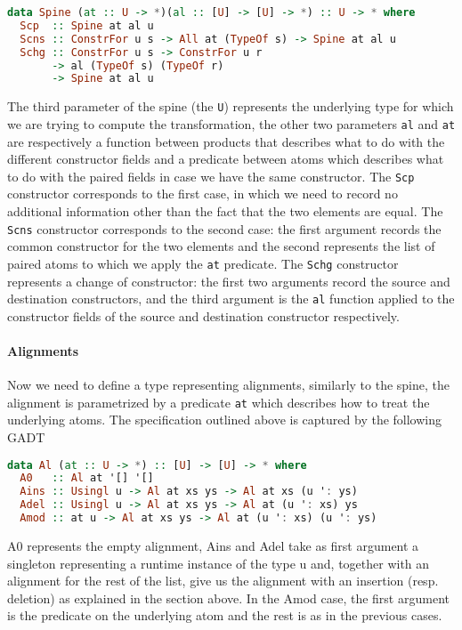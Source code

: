 \documentclass[11pt]{article}
\begin{document}
\begin{lstlisting}[language=haskell]
data Spine (at :: U -> *)(al :: [U] -> [U] -> *) :: U -> * where
  Scp  :: Spine at al u
  Scns :: ConstrFor u s -> All at (TypeOf s) -> Spine at al u
  Schg :: ConstrFor u s -> ConstrFor u r
       -> al (TypeOf s) (TypeOf r)
       -> Spine at al u
\end{lstlisting}

The third parameter of the spine (the \texttt{U}) represents the
underlying type for which we are trying to compute the transformation,
the other two parameters \texttt{al} and \texttt{at} are respectively a
function between products that describes what to do with the different
constructor fields and a predicate between atoms which describes what to
do with the paired fields in case we have the same constructor. The
\texttt{Scp} constructor corresponds to the first case, in which we need
to record no additional information other than the fact that the two
elements are equal. The \texttt{Scns} constructor corresponds to the
second case: the first argument records the common constructor for the
two elements and the second represents the list of paired atoms to which
we apply the \texttt{at} predicate. The \texttt{Schg} constructor
represents a change of constructor: the first two arguments record the
source and destination constructors, and the third argument is the
\texttt{al} function applied to the constructor fields of the source and
destination constructor respectively.

\paragraph{Alignments}\label{alignments}

Now we need to define a type representing alignments, similarly to the
spine, the alignment is parametrized by a predicate \texttt{at} which
describes how to treat the underlying atoms. The specification outlined
above is captured by the following GADT

\begin{lstlisting}[language=haskell]
data Al (at :: U -> *) :: [U] -> [U] -> * where
  A0   :: Al at '[] '[]
  Ains :: Usingl u -> Al at xs ys -> Al at xs (u ': ys)
  Adel :: Usingl u -> Al at xs ys -> Al at (u ': xs) ys
  Amod :: at u -> Al at xs ys -> Al at (u ': xs) (u ': ys)
\end{lstlisting}

A0 represents the empty alignment, Ains and Adel take as first argument
a singleton representing a runtime instance of the type u and, together
with an alignment for the rest of the list, give us the alignment with
an insertion (resp. deletion) as explained in the section above. In the
Amod case, the first argument is the predicate on the underlying atom
and the rest is as in the previous cases.
\end{document}

